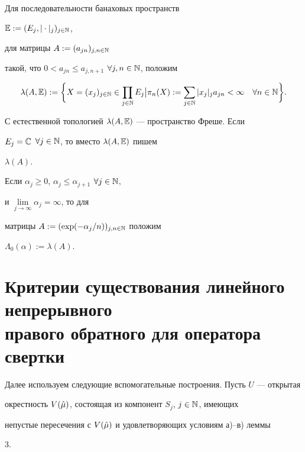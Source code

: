 \begin{defn} Для последовательности банаховых пространств 


$\Bbb E :=(E_j,|\cdot|_j)_{j\in\Bbb N}$,


для матрицы $A:=(a_{jn})_{j,n\in\Bbb N}$ 


такой, что $0<a_{jn}\le a_{j,n+1}$ $\forall j,n\in\Bbb N$, положим 


$$ 


\lambda(A,\Bbb E):=\biggl\{\bigl. X=(x_j)_{j\in\Bbb N}\in 


\prod_{j\in\Bbb N}E_j\bigr|\pi_n(X):=\sum_{j\in\Bbb N} 


|x_j|_ja_{jn}<\infty\quad \forall n\in \Bbb N\biggr\}. 


$$ 


С естественной топологией $\lambda(A,\Bbb E)$ --- пространство Фреше. Если 


$E_j=\Bbb C$ $\forall j\in\Bbb N$, то вместо $\lambda(A,\Bbb E)$ пишем 


$\lambda(A)$. 


 


Если $\alpha_j\ge 0$, $\alpha_j\le\alpha_{j+1}$ $\forall j\in\Bbb N$, 


и $\lim\limits_{j\to\infty}\alpha_j=\infty$, то для 


матрицы $A:=(\exp(-\alpha_j/n))_{j,n\in\Bbb N}$ положим 


$\Lambda_0(\alpha):=\lambda(A)$. 


\end{defn} 


 


\section{Критерии существования линейного непрерывного\protect\\


правого обратного для оператора свертки} 


 


Далее используем следующие вспомогательные построения. Пусть $U$ --- открытая 


окрестность $V(\Hat\mu)$, состоящая из компонент $S_j$, $j\in\Bbb N$, имеющих 


непустые пересечения с $V(\Hat\mu)$ и удовлетворяющих условиям а)--в) леммы 


3. 


